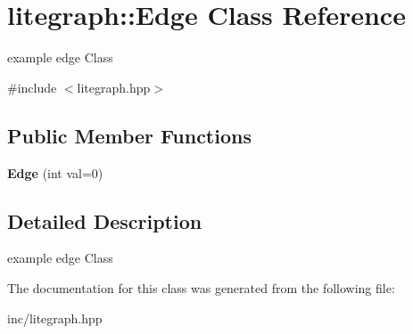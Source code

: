 \hypertarget{classlitegraph_1_1Edge}{}\section{litegraph\+:\+:Edge Class Reference}
\label{classlitegraph_1_1Edge}


example edge Class  




{\ttfamily \#include $<$litegraph.\+hpp$>$}

\subsection*{Public Member Functions}
\begin{DoxyCompactItemize}
\item 
\mbox{\label{classlitegraph_1_1Edge_a7cb29ba156d8bd18c1f9f4bc3258baa0}} 
{\bfseries Edge} (int val=0)
\end{DoxyCompactItemize}


\subsection{Detailed Description}
example edge Class 

The documentation for this class was generated from the following file\+:\begin{DoxyCompactItemize}
\item 
inc/litegraph.\+hpp\end{DoxyCompactItemize}
